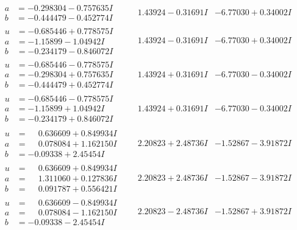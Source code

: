 \documentclass[1p]{elsarticle_modified}
\theoremstyle{definition}
\begin{document}
$$\begin{array}{c|c|c}
\begin{aligned}
a &= -0.298304 - 0.757635 I \\
b &= -0.444479 - 0.452774 I\end{aligned}
 & \phantom{-}1.43924 - 0.31691 I & -6.77030 + 0.34002 I \\ \hline\begin{aligned}
u &= -0.685446 + 0.778575 I \\
a &= -1.15899 - 1.04942 I \\
b &= -0.234179 - 0.846072 I\end{aligned}
 & \phantom{-}1.43924 - 0.31691 I & -6.77030 + 0.34002 I \\ \hline\begin{aligned}
u &= -0.685446 - 0.778575 I \\
a &= -0.298304 + 0.757635 I \\
b &= -0.444479 + 0.452774 I\end{aligned}
 & \phantom{-}1.43924 + 0.31691 I & -6.77030 - 0.34002 I \\ \hline\begin{aligned}
u &= -0.685446 - 0.778575 I \\
a &= -1.15899 + 1.04942 I \\
b &= -0.234179 + 0.846072 I\end{aligned}
 & \phantom{-}1.43924 + 0.31691 I & -6.77030 - 0.34002 I \\ \hline\begin{aligned}
u &= \phantom{-}0.636609 + 0.849934 I \\
a &= \phantom{-}0.078084 + 1.162150 I \\
b &= -0.09338 + 2.45454 I\end{aligned}
 & \phantom{-}2.20823 + 2.48736 I & -1.52867 - 3.91872 I \\ \hline\begin{aligned}
u &= \phantom{-}0.636609 + 0.849934 I \\
a &= \phantom{-}1.311060 + 0.127836 I \\
b &= \phantom{-}0.091787 + 0.556421 I\end{aligned}
 & \phantom{-}2.20823 + 2.48736 I & -1.52867 - 3.91872 I \\ \hline\begin{aligned}
u &= \phantom{-}0.636609 - 0.849934 I \\
a &= \phantom{-}0.078084 - 1.162150 I \\
b &= -0.09338 - 2.45454 I\end{aligned}
 & \phantom{-}2.20823 - 2.48736 I & -1.52867 + 3.91872 I \\ \hline\begin{aligned}

\end{aligned}
\end{array}$$
\end{document}
